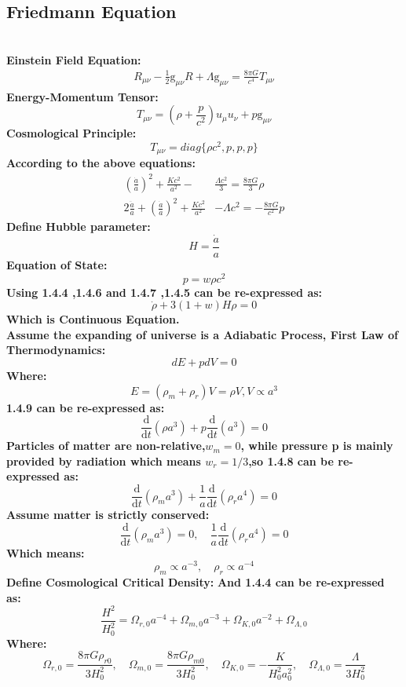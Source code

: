 \documentclass[14pt]{article}
\newcommand{\derivo}[2]{\frac{\mathrm{d} #1 }{\mathrm{d} #2}}
\newcommand{\g}{\mathrm{g}}
\begin{document}
\subsection{Friedmann Equation}
\quad\\
\textbf{Einstein Field Equation:}
\begin{align*}
R_{\mu \nu}-\frac{1}{2}\g_{\mu \nu}R + \Lambda \g_{\mu \nu} = \frac{8\pi G}{c^{4}}T_{\mu \nu} \tag{1.4.1}
\end{align*}
\textbf{Energy-Momentum Tensor:}
\[
T_{\mu\nu}=(\rho+\frac{p}{c^{2}})u_{\mu}u_{\nu}+p\g_{\mu\nu} \tag{1.4.2}
\]
\textbf{Cosmological Principle:}
\[
T_{\mu\nu}= diag\{\rho c^{2},p,p,p\} \tag{1.4.3}
\]
\textbf{According to the above equations:}
\begin{align*}
    (\frac{\dot{a}}{a})^{2}+\frac{Kc^{2}}{a^{2}}-&\frac{\Lambda c^{2}}{3}=\frac{8\pi G}{3}\rho\tag{1.4.4}\\
    2\frac{\ddot{a}}{a}+(\frac{\dot{a}}{a})^{2}+\frac{Kc^{2}}{a^{2}}&-\Lambda c^{2}=-\frac{8\pi G}{c^{2}}p \tag{1.4.5}
\end{align*}
\textbf{Define Hubble parameter:}
\[
H = \frac{\dot{a}}{a}\tag{1.4.6}
\]
\textbf{Equation of State:}
\[
p=w\rho c^{2} \tag{1.4.7}
\]
\textbf{Using 1.4.4 ,1.4.6 and 1.4.7 ,1.4.5 can be re-expressed as:}
\[
\dot{\rho}+3(1+w)H\rho=0 \tag{1.4.8}
\]
\textbf{Which is Continuous Equation.}\\
\textbf{Assume the expanding of universe is a Adiabatic Process, First Law of Thermodynamics:}
\[
dE+pdV=0 \tag{1.4.9}
\]
\textbf{Where:}
\[
E=(\rho_{m}+\rho_{r})V=\rho V,V \propto a^{3}\tag{1.4.10}
\]
\textbf{1.4.9 can be re-expressed as:}
\[
\derivo{}{t}(\rho a^{3})+p\derivo{}{t}(a^{3})=0\tag{1.4.11}
\]
\textbf{Particles of matter are non-relative,\(w_{m}=0\), while pressure p is mainly provided by radiation which means \(w_{r}=1/3\),so 1.4.8 can be re-expressed as:}\citep{CLSS1}
\[
\derivo{}{t}(\rho_{m} a^{3})+\frac{1}{a}\derivo{}{t}(\rho_{r}a^{4})=0\tag{1.4.12}
\]
\textbf{Assume matter is strictly conserved:}
\[
\derivo{}{t}(\rho_{m} a^{3})=0,\quad \frac{1}{a}\derivo{}{t}(\rho_{r}a^{4})=0\tag{1.4.13}
\]
\textbf{Which means:}
\[
\rho_{m} \propto a^{-3},\quad \rho_{r} \propto a^{-4}\tag{1.4.14}
\]
\textbf{Define Cosmological Critical Density:}
\textbf{And 1.4.4 can be re-expressed as:}
\[
\frac{H^{2}}{H^{2}_{0}} = \Omega_{r,0}a^{-4}+\Omega_{m,0}a^{-3}+\Omega_{K,0}a^{-2}+\Omega_{\Lambda,0}\tag{1.4.15}
\]
\textbf{Where:}
\[
\Omega_{r,0}=\frac{8\pi G\rho_{r0}}{3H^{2}_{0}},\quad \Omega_{m,0}=\frac{8\pi G\rho_{m0}}{3H^{2}_{0}},\quad \Omega_{K,0}=-\frac{K}{H^{2}_{0}a^{2}_{0}},\quad \Omega_{\Lambda,0}=\frac{\Lambda}{3H^{2}_{0}}\tag{1.4.16}
\]
\end{document}
